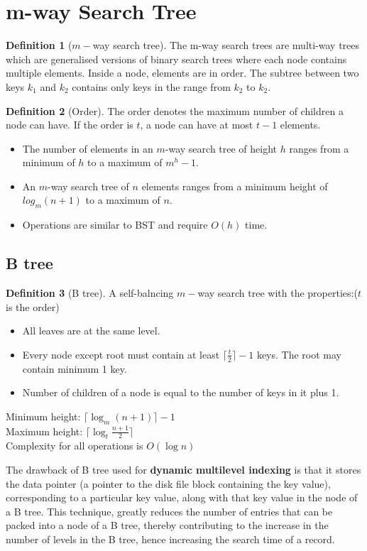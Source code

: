 \documentclass[10pt, a4paper]{extarticle}
\theoremstyle{definition}
\newtheorem{defn}{Definition}
\begin{document}
	\section{m-way Search Tree}
	\begin{defn}[$m-$way search tree]
		The m-way search trees are multi-way trees which are generalised versions of binary search trees where each node contains multiple elements. Inside a node, elements are in order. The subtree between two keys $k_1$ and $k_2$ contains only keys in the range from $k_2$ to $k_2$.
	\end{defn}
	\begin{defn}[Order]
		The order denotes the maximum number of children a node can have. If the order is $t$, a node can have at most $t-1$ elements.
	\end{defn}
	\begin{itemize}
\item The number of elements in an $m$-way search tree of height $h$ ranges from a minimum of $h$ to a maximum of $m^{h} -1$.

\item An $m$-way search tree of $n$ elements ranges from a minimum height of $log_m(n+1)$ to a maximum of $n$.
\item Operations are similar to BST and require $O(h)$ time.
\end{itemize}
	\subsection{B tree}
	\begin{defn}[B tree]
		A self-balncing $m-$way search tree with the properties:($t$ is the order)
		\begin{itemize}
			\item All leaves are at the same level.
			\item Every node except root must contain at least $\lceil\frac{t}{2}\rceil-1$ keys. The root may contain minimum 1 key.
			\item Number of children of a node is equal to the number of keys in it plus 1.
		\end{itemize}
		Minimum height: $\lceil\log_m(n+1)\rceil-1$\\
		Maximum height: $\lceil\log_t\frac{n+1}{2}\rceil$\\
		Complexity for all operations is $O(\log n)$
	\end{defn}
	The drawback of B tree used for \textbf{dynamic multilevel indexing} is that it stores the data pointer (a pointer to the disk file block containing the key value), corresponding to a particular key value, along with that key value in the node of a B tree. This technique, greatly reduces the number of entries that can be packed into a node of a B tree, thereby contributing to the increase in the number of levels in the B tree, hence increasing the search time of a record.
\end{document}
